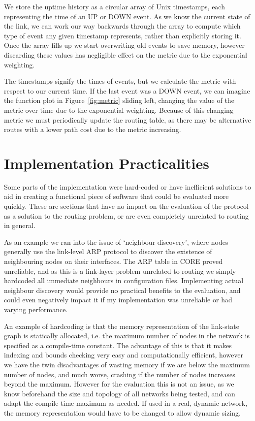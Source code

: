 \documentclass[withindex,glossary,openany]{cam-thesis}
\begin{document}
We store the uptime history as a circular array of Unix timestamps, each representing the time of an UP or DOWN event. As we know the current state of the link, we can work our way backwards through the array to compute which type of event any given timestamp represents, rather than explicitly storing it. Once the array fills up we start overwriting old events to save memory, however discarding these values has negligible effect on the metric due to the exponential weighting.

The timestamps signify the times of events, but we calculate the metric with respect to our current time. If the last event was a DOWN event, we can imagine the function plot in Figure~\ref{fig:metric} sliding left, changing the value of the metric over time due to the exponential weighting. Because of this changing metric we must periodically update the routing table, as there may be alternative routes with a lower path cost due to the metric increasing.

\section{Implementation Practicalities}

Some parts of the implementation were hard-coded or have inefficient solutions to aid in creating a functional piece of software that could be evaluated more quickly. These are sections that have no impact on the evaluation of the protocol as a solution to the routing problem, or are even completely unrelated to routing in general.

As an example we ran into the issue of `neighbour discovery', where nodes generally use the link-level ARP protocol to discover the existence of neighbouring nodes on their interfaces. The ARP table in CORE proved unreliable, and as this is a link-layer problem unrelated to routing we simply hardcoded all immediate neighbours in configuration files. Implementing actual neighbour discovery would provide no practical benefits to the evaluation, and could even negatively impact it if my implementation was unreliable or had varying performance.

An example of hardcoding is that the memory representation of the link-state graph is statically allocated, i.e. the maximum number of nodes in the network is specified as a compile-time constant. The advantage of this is that it makes indexing and bounds checking very easy and computationally efficient, however we have the twin disadvantages of wasting memory if we are below the maximum number of nodes, and much worse, crashing if the number of nodes increases beyond the maximum. However for the evaluation this is not an issue, as we know beforehand the size and topology of all networks being tested, and can adapt the compile-time maximum as needed. If used in a real, dynamic network, the memory representation would have to be changed to allow dynamic sizing.
\end{document}
